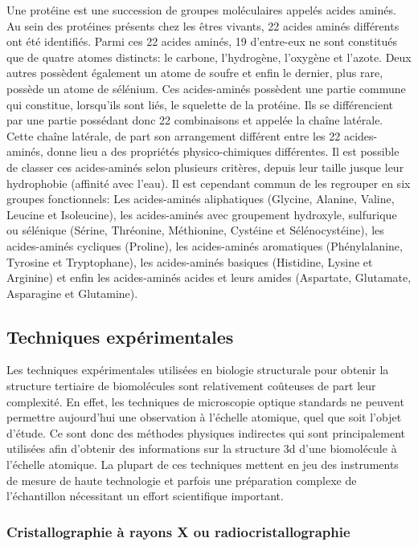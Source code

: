 Une protéine est une succession de groupes moléculaires appelés acides aminés. Au sein des protéines présents chez les êtres vivants, 22 acides aminés différents ont été identifiés. Parmi ces 22 acides aminés, 19 d'entre-eux ne sont constitués que de quatre atomes distincts: le carbone, l'hydrogène, l'oxygène et l'azote. Deux autres possèdent également un atome de soufre et enfin le dernier, plus rare, possède un atome de sélénium. Ces acides-aminés possèdent une partie commune qui constitue, lorsqu'ils sont liés, le squelette de la protéine. Ils se différencient par une partie possédant donc 22 combinaisons et appelée la chaîne latérale. Cette chaîne latérale, de part son arrangement différent entre les 22 acides-aminés, donne lieu a des propriétés physico-chimiques différentes. Il est possible de classer ces acides-aminés selon plusieurs critères, depuis leur taille jusque leur hydrophobie (affinité avec l'eau). Il est cependant commun de les regrouper en six groupes fonctionnels: Les acides-aminés aliphatiques (Glycine, Alanine, Valine, Leucine et Isoleucine), les acides-aminés avec groupement hydroxyle, sulfurique ou sélénique (Sérine, Thréonine, Méthionine, Cystéine et Sélénocystéine), les acides-aminés cycliques (Proline), les acides-aminés aromatiques (Phénylalanine, Tyrosine et Tryptophane), les acides-aminés basiques (Histidine, Lysine et Arginine) et enfin les acides-aminés acides et leurs amides (Aspartate, Glutamate, Asparagine et Glutamine).



\subsection{Techniques expérimentales}

Les techniques expérimentales utilisées en biologie structurale pour obtenir la structure tertiaire de biomolécules sont relativement coûteuses de part leur complexité. En effet, les techniques de microscopie optique standards ne peuvent permettre aujourd'hui une observation à l'échelle atomique, quel que soit l'objet d'étude. Ce sont donc des méthodes physiques indirectes qui sont principalement utilisées afin d'obtenir des informations sur la structure 3d d'une biomolécule à l'échelle atomique. La plupart de ces techniques mettent en jeu des instruments de mesure de haute technologie et parfois une préparation complexe de l'échantillon nécessitant un effort scientifique important.

\subsubsection{Cristallographie à rayons X ou radiocristallographie}

